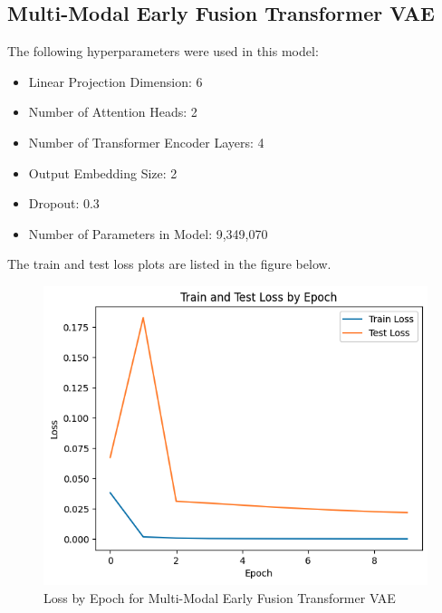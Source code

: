 \documentclass[11pt,a4paper]{article}
\begin{document}
\subsection{Multi-Modal Early Fusion Transformer VAE }

The following hyperparameters were used in this model:
 \begin{itemize}
     \item Linear Projection Dimension: 6
     \item Number of Attention Heads: 2
     \item Number of Transformer Encoder Layers: 4
     \item Output Embedding Size: 2
     \item Dropout: 0.3
     \item Number of Parameters in Model: 9,349,070
 \end{itemize}

The train and test loss plots are listed in the figure below.

\begin{figure}[H]
    \centering
    \includegraphics[width=0.5\linewidth]{Figure 3 Rename Final v2.png}
    \caption{Loss by Epoch for Multi-Modal Early Fusion Transformer VAE}
    \label{fig:enter-label}
\end{figure}
\end{document}
